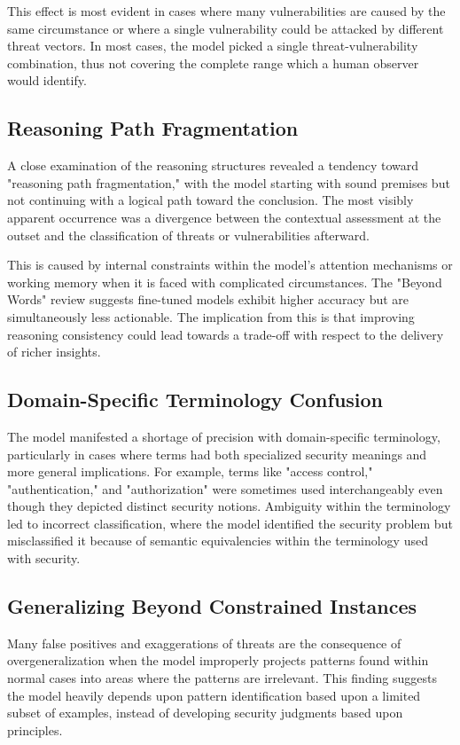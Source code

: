 \documentclass[sigconf]{acmart}
\begin{document}
This effect is most evident in cases where many vulnerabilities are caused by the same circumstance or where a single vulnerability could be attacked by different threat vectors. In most cases, the model picked a single threat-vulnerability combination, thus not covering the complete range which a human observer would identify. 

\subsection{Reasoning Path Fragmentation}
A close examination of the reasoning structures revealed a tendency toward "reasoning path fragmentation," with the model starting with sound premises but not continuing with a logical path toward the conclusion. The most visibly apparent occurrence was a divergence between the contextual assessment at the outset and the classification of threats or vulnerabilities afterward. 

This is caused by internal constraints within the model's attention mechanisms or working memory when it is faced with complicated circumstances. The "Beyond Words" review suggests fine-tuned models exhibit higher accuracy but are simultaneously less actionable. The implication from this is that improving reasoning consistency could lead towards a trade-off with respect to the delivery of richer insights.

\subsection{Domain-Specific Terminology Confusion}
The model manifested a shortage of precision with domain-specific terminology, particularly in cases where terms had both specialized security meanings and more general implications. For example, terms like "access control," "authentication," and "authorization" were sometimes used interchangeably even though they depicted distinct security notions. Ambiguity within the terminology led to incorrect classification, where the model identified the security problem but misclassified it because of semantic equivalencies within the terminology used with security.

\subsection{Generalizing Beyond Constrained Instances}
Many false positives and exaggerations of threats are the consequence of overgeneralization when the model improperly projects patterns found within normal cases into areas where the patterns are irrelevant. This finding suggests the model heavily depends upon pattern identification based upon a limited subset of examples, instead of developing security judgments based upon principles.
\end{document}
